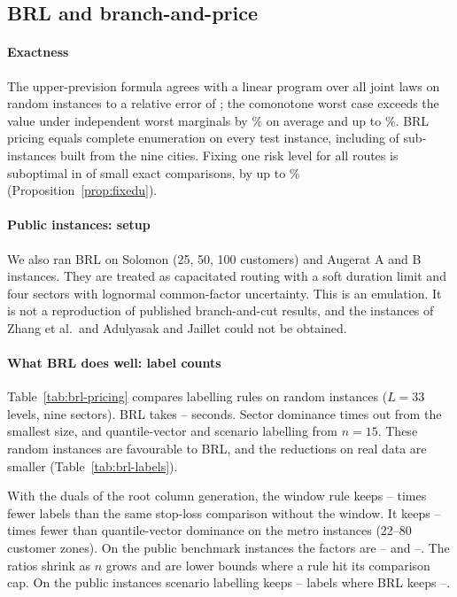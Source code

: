 \documentclass[preprint,12pt]{elsarticle}
\theoremstyle{definition}
\theoremstyle{remark}
\begin{document}
\subsection{BRL and branch-and-price}\label{sec:res-brl}

\paragraph{Exactness} The upper-prevision formula agrees with a linear program over all joint laws on \BRLtestAn{} random instances to a relative error of \BRLtestAerr; the comonotone worst case exceeds the value under independent worst marginals by \BRLindepMean\% on average and up to \BRLindepMax\%. BRL pricing equals complete enumeration on every test instance, including \BRLrealCmatch{} of \BRLrealCn{} sub-instances built from the nine cities. Fixing one risk level for all routes is suboptimal in \BRLfixeduSub{} of \BRLfixeduN{} small exact comparisons, by up to \BRLfixeduMax\% (Proposition~\ref{prop:fixedu}).

\paragraph{Public instances: setup} We also ran BRL on Solomon (25, 50, 100 customers) and Augerat A and B instances. They are treated as capacitated routing with a soft duration limit and four sectors with lognormal common-factor uncertainty. This is an emulation. It is not a reproduction of published branch-and-cut results, and the instances of Zhang et al.\ and Adulyasak and Jaillet could not be obtained.

\paragraph{What BRL does well: label counts} Table~\ref{tab:brl-pricing} compares labelling rules on random instances ($L=33$ levels, nine sectors). BRL takes \BRLtimeMin--\BRLtimeMax{} seconds. Sector dominance times out from the smallest size, and quantile-vector and scenario labelling from $n=15$. These random instances are favourable to BRL, and the reductions on real data are smaller (Table~\ref{tab:brl-labels}).

With the duals of the root column generation, the window rule keeps \BrlLabNowinMetroMin--\BrlLabNowinMetroMax{} times fewer labels than the same stop-loss comparison without the window. It keeps \BrlLabQvMetroMin--\BrlLabQvMetroMax{} times fewer than quantile-vector dominance on the metro instances (22--80 customer zones). On the public benchmark instances the factors are \BrlLabNowinPubMin--\BrlLabNowinPubMax{} and \BrlLabQvPubMin--\BrlLabQvPubMax. The ratios shrink as $n$ grows and are lower bounds where a rule hit its comparison cap. On the public instances scenario labelling keeps \BrlLabelsScenMin--\BrlLabelsScenMax{} labels where BRL keeps \BrlLabelsBrlMin--\BrlLabelsBrlMax.
\end{document}
